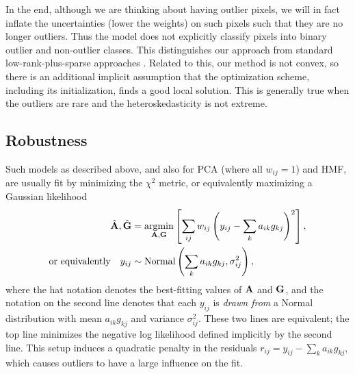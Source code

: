 \documentclass[onecolumn,floatfix]{aastex631}
\DeclareMathOperator*{\argmin}{argmin}
\newcommand{\tom}[1]{\textcolor{teal}{\textbf{TH says:} #1}}
\newcommand{\hogg}[1]{\textcolor{red}{\textbf{DWH says:} #1}}
\begin{document}
In the end, although we are thinking about having outlier pixels, we will in fact inflate the uncertainties (lower the weights) on such pixels such that they are no longer outliers.
Thus the model does not explicitly classify pixels into binary outlier and non-outlier classes.
This distinguishes our approach from standard low-rank-plus-sparse approaches \citep{candes2011}.
Related to this, our method is not convex, so there is an additional implicit assumption that the optimization scheme, including its initialization, finds a good local solution.
This is generally true when the outliers are rare and the heteroskedasticity is not extreme.

\subsection{Robustness}

Such models as described above, and also for PCA (where all $w_{ij} = 1$) and HMF, are usually fit by minimizing the $\chi^2$ metric, or equivalently maximizing a Gaussian likelihood
\begin{align}
    \hat{\bf A}, \hat{\bf G} &= \argmin_{{\bf A},{\bf G}} \left[\sum_{ij} w_{ij}\left(y_{ij} - \sum_k a_{ik} g_{kj} \right)^2\right], \\
    {\rm or \,\, equivalently} \quad y_{ij} &\sim {\rm Normal} \left( \sum_k a_{ik} g_{kj}, \sigma^2_{ij}\right),
\end{align}
where the hat notation denotes the best-fitting values of ${\bf A}$ and ${\bf G}$, and the notation on the second line denotes that each $y_{ij}$ is \emph{drawn from} a Normal distribution with mean $a_{ik} g_{kj}$ and variance $\sigma_{ij}^2$.
These two lines are equivalent; the top line minimizes the negative log likelihood defined implicitly by the second line.
This setup induces a quadratic penalty in the residuals $r_{ij} = y_{ij} - \sum_k a_{ik}g_{kj}$, which causes outliers to have a large influence on the fit.
\end{document}
